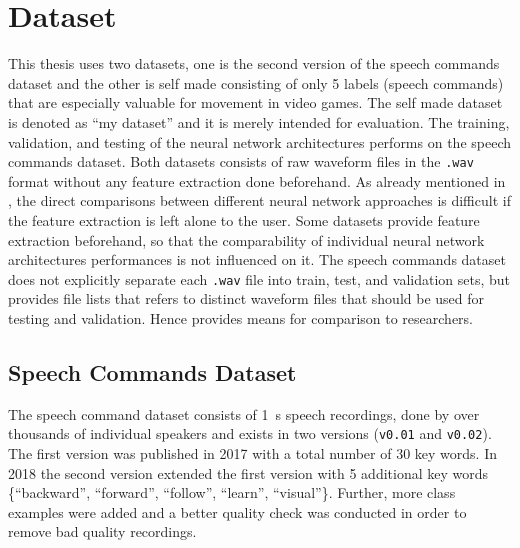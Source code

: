 
\section{Dataset}\label{sec:exp_dataset}
This thesis uses two datasets, one is the second version of the speech commands dataset \cite{Warden2018} and the other is self made consisting of only 5 labels (speech commands) that are especially valuable for movement in video games.
The self made dataset is denoted as \enquote{my dataset} and it is merely intended for evaluation.
The training, validation, and testing of the neural network architectures performs on the speech commands dataset.
Both datasets consists of raw waveform files in the \texttt{.wav} format without any feature extraction done beforehand.
As already mentioned in , the direct comparisons between different neural network approaches is difficult if the feature extraction is left alone to the user.
Some datasets provide feature extraction beforehand, so that the comparability of individual neural network architectures performances is not influenced on it.
The speech commands dataset does not explicitly separate each \texttt{.wav} file into train, test, and validation sets, but provides file lists that refers to distinct waveform files that should be used for testing and validation. 
Hence provides means for comparison to researchers.



\subsection{Speech Commands Dataset}\label{sec:exp_dataset_speech_cmd}
The speech command dataset \cite{Warden2018} consists of \SI{1}{\second} speech recordings, done by over thousands of individual speakers and exists in two versions (\texttt{v0.01} and \texttt{v0.02}).
The first version was published in 2017 with a total number of 30 key words.
In 2018 the second version extended the first version with 5 additional key words \{\enquote{backward}, \enquote{forward}, \enquote{follow}, \enquote{learn}, \enquote{visual}\}.
Further, more class examples were added and a better quality check was conducted in order to remove bad quality recordings.

